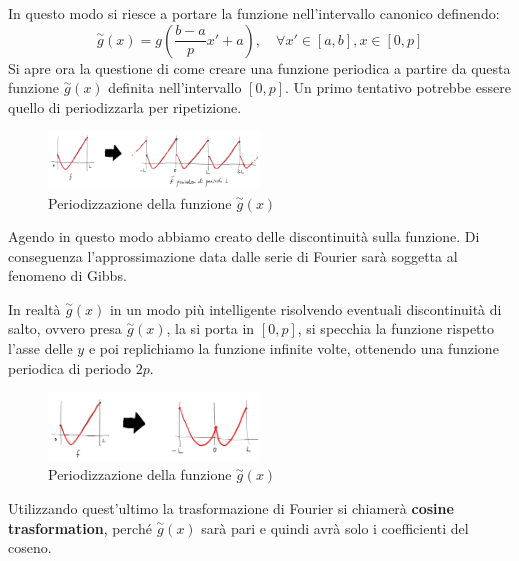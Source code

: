 In questo modo si riesce a portare la funzione nell'intervallo canonico definendo:
\begin{equation*}
    \stackrel{\sim}{g}(x) = g\left(\frac{b-a}{p}x'+a\right), \quad \forall x' \in [a,b], x \in [0,p]
\end{equation*}
Si apre ora la questione di come creare una funzione periodica a partire da questa
funzione $\stackrel{\sim}{g}(x)$ definita nell'intervallo $[0, p]$. Un primo
tentativo potrebbe essere quello di periodizzarla per ripetizione. 
\begin{figure}[!ht]
    \centering
    \includegraphics[width=0.5\textwidth]{img/Serie/ripetizione.png}
    \caption{Periodizzazione della funzione $\stackrel{\sim}{g}(x)$}
    \label{fig:ripetizione}
\end{figure}

Agendo in questo modo abbiamo creato delle discontinuità sulla funzione. Di conseguenza
l'approssimazione data dalle serie di Fourier sarà soggetta al fenomeno di Gibbs.

In realtà $\stackrel{\sim}{g}(x)$ in un modo più intelligente risolvendo eventuali
discontinuità di salto, ovvero presa $\stackrel{\sim}{g}(x)$, la si porta in $[0,p]$,
si specchia la funzione rispetto l'asse delle $y$ e poi replichiamo la funzione
infinite volte, ottenendo una funzione periodica di periodo $2p$.
\begin{figure}[!ht]
    \centering
    \includegraphics[width=0.5\textwidth]{img/Serie/specchio.png}
    \caption{Periodizzazione della funzione $\stackrel{\sim}{g}(x)$}
    \label{fig:specchio}
\end{figure}

Utilizzando quest'ultimo la trasformazione di Fourier si chiamerà \textbf{cosine trasformation},
perché $\stackrel{\sim}{g}(x)$ sarà pari e quindi avrà solo i coefficienti del coseno.